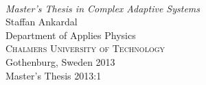 \begin{titlepage}

\mbox{}
\vfill
\addtolength{\voffset}{2cm}
\begin{flushleft}
	{ \\[0.5cm]
	\emph{\Large Master's Thesis in Complex Adaptive Systems} \\[.8cm]
	
	{\huge Staffan Ankardal}\\[.8cm]
	
	{\Large Department of Applies Physics\\
	\textsc{Chalmers University of Technology} \\
	Gothenburg, Sweden 2013 \\
	Master's Thesis 2013:1\\
	} 
	}
\end{flushleft}

\end{titlepage}
\ClearShipoutPicture


